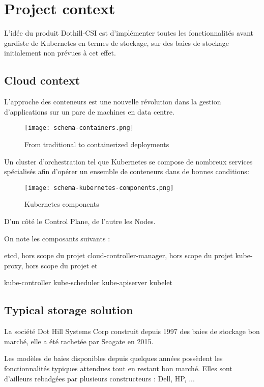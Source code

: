 \section{Project context}

\color{darkgreen}
L'idée du produit Dothill-CSI est d'implémenter toutes les fonctionnalités avant gardiste de Kubernetes en termes de stockage, sur des baies de stockage initialement non prévues à cet effet.
\color{black}

\subsection{Cloud context}

\color{darkgreen}
L'approche des conteneurs est une nouvelle révolution dans la gestion d'applications sur un parc de machines en data centre.

\begin{figure}[h]
    \centering
    \texttt{[image: schema-containers.png]}
    \caption{From traditional to containerized deployments}
\end{figure}

Un cluster d'orchestration tel que Kubernetes se compose de nombreux services spécialisés afin d'opérer un ensemble de conteneurs dans de bonnes conditions:

\begin{figure}[h]
    \centering
    \texttt{[image: schema-kubernetes-components.png]}
    \caption{Kubernetes components}
\end{figure}

D'un côté le Control Plane, de l'autre les Nodes.

On note les composants suivants :

etcd, hors scope du projet
cloud-controller-manager, hors scope du projet
kube-proxy, hors scope du projet
et

kube-controller
kube-scheduler
kube-apiserver
kubelet
\color{black}

\subsection{Typical storage solution}

\color{darkgreen}
La société Dot Hill Systems Corp construit depuis 1997 des baies de stockage bon marché, elle a été rachetée par Seagate en 2015.

Les modèles de baies disponibles depuis quelques années possèdent les fonctionnalités typiques attendues tout en restant bon marché. Elles sont d'ailleurs rebadgées par plusieurs constructeurs : Dell, HP, ...

